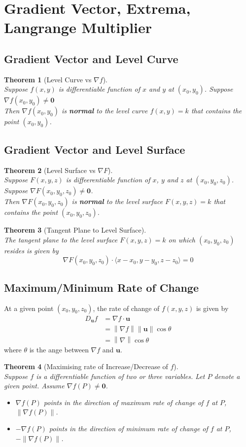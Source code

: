 \documentclass[12pt]{article}
\newcommand\norm[1]{\left\lVert#1\right\rVert}
\newtheorem{theorem}{Theorem}[section]
\theoremstyle{definition}
\newcommand\ve[1]{\mathbf{#1}}
\begin{document}
\section{Gradient Vector, Extrema, Langrange Multiplier}
\subsection{Gradient Vector and Level Curve}
\begin{theorem}[Level Curve vs $\nabla f$]
\hfill\\\normalfont Suppose $f(x,y)$ is differentiable function of $x$ and $y$ at $(x_0,y_0)$. Suppose $\nabla f(x_0,y_0)\neq \ve{0}$\\
Then $\nabla f(x_0,y_0)$ is \textbf{normal} to the level curve $f(x,y)=k$ that contains the point $(x_0,y_0)$.
\end{theorem}
\subsection{Gradient Vector and Level Surface}
\begin{theorem}[Level Surface vs $\nabla F$]
\hfill\\\normalfont Suppose $F(x,y,z)$ is diffeerentiable function of $x$, $y$ and $z$ at $(x_0,y_0,z_0)$. Suppose $\nabla F(x_0,y_0,z_0)\neq \ve{0}$.\\
Then $\nabla F(x_0,y_0,z_0)$ is \textbf{normal} to the level surface $F(x,y,z)=k$ that contains the point $(x_0,y_0,z_0)$.
\end{theorem}
\begin{theorem}[Tangent Plane to Level Surface]
\hfill\\\normalfont The tangent plane to the level surface $F(x,y,z)=k$ on which $(x_0,y_0,z_0)$ resides is given by
\[
\nabla F(x_0,y_0,z_0)\cdot\langle x-x_0,y-y_0,z-z_0\rangle = 0
\]
\end{theorem}
\subsection{Maximum/Minimum Rate of Change}
At a given point $(x_0,y_0,z_0)$, the rate of change of $f(x,y,z)$ is given by
\begin{align*}
D_\ve{u}f&=\nabla f\cdot\ve{u}\\
&=\norm{\nabla f}\norm{\ve{u}}\cos\theta\\
&=\norm{\nabla}\cos\theta
\end{align*}
where $\theta$ is the ange between $\nabla f$ and $\ve{u}$.
\begin{theorem}[Maximising rate of Increase/Decrease of $f$]
\hfill\\\normalfont Suppose $f$ is a differentiable function of two or three variables. Let $P$ denote a given point. Assume $\nabla f(P)\neq \ve{0}$.
\begin{itemize}
  \item $\nabla f(P)$ points in the direction of maximum rate of change of $f$ at $P$,$\norm{\nabla f(P)}$.
  \item $-\nabla f(P)$ points in the direction of minimum rate of change of $f$ at $P$,$-\norm{\nabla f(P)}$.
\end{itemize}
\end{theorem}
\end{document}
